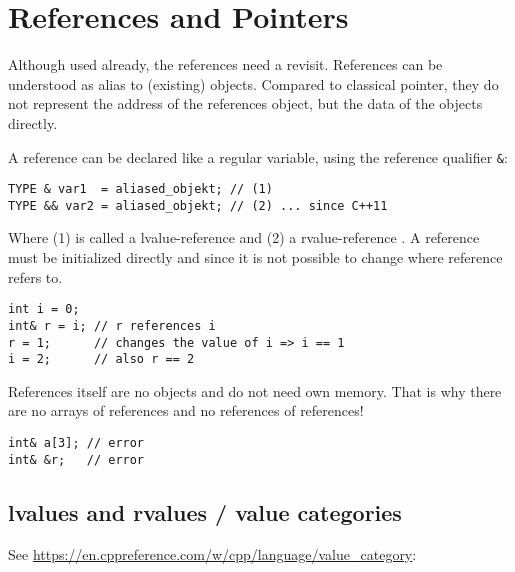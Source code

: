 
\section{References and Pointers\label{sec:references}}
Although used already, the references need a revisit. References can be understood as alias to (existing) objects. Compared to classical
pointer, they do not represent the address of the references object, but the data of the objects directly.

A reference can be declared like a regular variable, using the reference qualifier \texttt{\&}:
\begin{verbatim}
TYPE & var1  = aliased_objekt; // (1)
TYPE && var2 = aliased_objekt; // (2) ... since C++11
\end{verbatim}
Where (1) is called a lvalue-reference  and (2) a rvalue-reference . A reference
must be initialized directly and since it is not possible to change where reference refers to.

\begin{verbatim}
int i = 0;
int& r = i; // r references i
r = 1;      // changes the value of i => i == 1
i = 2;      // also r == 2
\end{verbatim}

References itself are no objects and do not need own memory. That is why there are no arrays of references and no references of references!
\begin{verbatim}
int& a[3]; // error
int& &r;   // error
\end{verbatim}


\subsection{lvalues and rvalues / value categories}
See \url{https://en.cppreference.com/w/cpp/language/value_category}:

